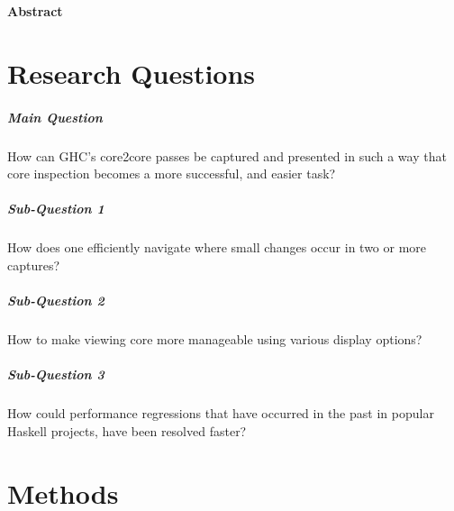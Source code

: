 \documentclass{report}
\begin{document}
\vspace*{\fill}
\begin{center}
\begin{minipage}{.7\textwidth}
\centerline{\textbf{Abstract}}

\end{minipage}
\end{center}
\vfill %

\thispagestyle{empty}

\newpage
\clearpage
{}
\tableofcontents

\newpage
\clearpage
{}

\newpage



\chapter{Research Questions}


\paragraph{Main Question} 
How can GHC’s core2core passes be captured and presented in such a way that core
inspection becomes a more successful, and easier task?

\hfill \break

\paragraph{Sub-Question 1} 
How does one efficiently navigate where small changes occur in two or more captures?

\paragraph{Sub-Question 2}
How to make viewing core more manageable using various display options?

\paragraph{Sub-Question 3}
How could performance regressions that have occurred in the past in popular Haskell projects,
have been resolved faster?


\newpage


\chapter{Methods}
\end{document}

